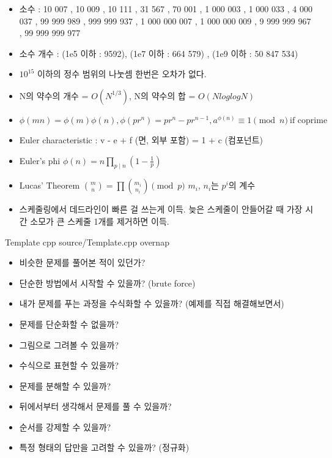 \documentclass[landscape, 10pt, a4paper, oneside, twocolumn]{extarticle}
\begin{document}
\begin{itemize}
\item 소수 : 10 007 , 10 009 , 10 111 , 31 567 , 70 001 , 1 000 003 , 1 000 033 , 4 000 037 , 99 999 989 , 999 999 937 , 1 000 000 007 , 1 000 000 009 , 9 999 999 967 , 99 999 999 977
\item 소수 개수 : (1e5 이하 : 9592), (1e7 이하 : 664 579) , (1e9 이하 : 50 847 534) 
\item $10^{15}$ 이하의 정수 범위의 나눗셈 한번은 오차가 없다.
\item N의 약수의 개수 = $O(N^{1/3})$, N의 약수의 합 = $O(NloglogN)$
\item $\phi(mn) = \phi(m) \phi(n) , \phi(pr^n) = pr^n - pr^{n-1} , a^{\phi(n)} \equiv 1 \pmod{n} \ \text{if coprime}$
\end{itemize}

\begin{itemize}  %
\item Euler characteristic : v - e + f (면, 외부 포함) = 1 + c (컴포넌트)
\item Euler's phi $\phi (n)=n\prod _{p\mid n}\left(1-{\frac {1}{p}}\right)$
\item Lucas' Theorem $\binom{m}{n}=\prod\binom{m_i}{n_i} \pmod p$ $m_i$, $n_i$는 $p^i$의 계수
\item 스케줄링에서 데드라인이 빠른 걸 쓰는게 이득. 늦은 스케줄이 안들어갈 때 가장 시간 소모가 큰 스케줄 1개를 제거하면 이득.
\end{itemize}

\Algorithm
{Template}
{}
{}
{cpp}
{source/Template.cpp}
{overnap}


\begin{itemize}
\item 비슷한 문제를 풀어본 적이 있던가?
\item 단순한 방법에서 시작할 수 있을까? (brute force)
\item 내가 문제를 푸는 과정을 수식화할 수 있을까? (예제를 직접 해결해보면서)
\item 문제를 단순화할 수 없을까?
\item 그림으로 그려볼 수 있을까?
\item 수식으로 표현할 수 있을까?
\item 문제를 분해할 수 있을까?
\item 뒤에서부터 생각해서 문제를 풀 수 있을까?
\item 순서를 강제할 수 있을까?
\item 특정 형태의 답만을 고려할 수 있을까? (정규화)
\end{itemize}
\end{document}
